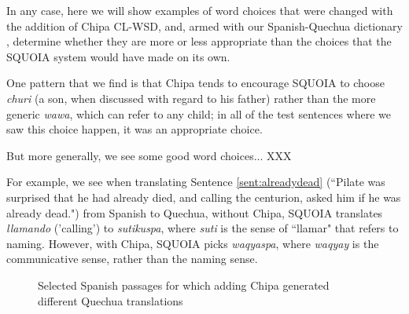 In any case, here we will show examples of word choices that were changed with
the addition of Chipa CL-WSD, and, armed with our Spanish-Quechua dictionary
\cite{academiamayor}, determine whether they are more or less appropriate than
the choices that the SQUOIA system would have made on its own.


One pattern that we find is that Chipa tends to encourage SQUOIA to choose
\emph{churi} (a son, when discussed with regard to his father) rather than the
more generic \emph{wawa}, which can refer to any child; in all of the test
sentences where we saw this choice happen, it was an appropriate choice.

But more generally, we see some good word choices... XXX


For example, we see when translating Sentence \ref{sent:alreadydead} (``Pilate
was surprised that he had already died, and calling the centurion, asked him if
he was already dead.") from Spanish to Quechua, without Chipa, SQUOIA
translates \emph{llamando} ('calling') to \emph{sutikuspa}, where \emph{suti}
is the sense of ``llamar" that refers to naming. However, with Chipa, SQUOIA
picks \emph{waqyaspa}, where \emph{waqyay} is the communicative sense, rather
than the naming sense.

\begin{figure}
\label{sent:alreadydead}

\label{sent:putyourhand}

  \caption{Selected Spanish passages for which adding Chipa generated different
  Quechua translations}
  \label{fig:some-spanish-verses-with-changes}
\end{figure}
